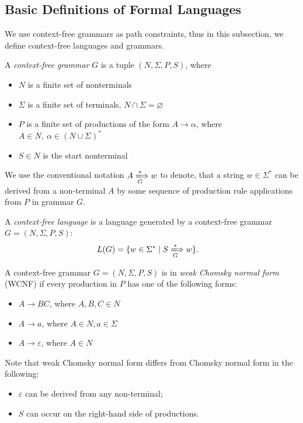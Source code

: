 \subsection{Basic Definitions of Formal Languages}
We use context-free grammars as path constraints, thus in this subsection, we define context-free languages and grammars.

\begin{definition}A \emph{context-free grammar} $G$ is a tuple $(N, \Sigma, P, S)$, where
\begin{itemize}
    \item $N$ is a finite set of nonterminals
    \item $\Sigma$ is a finite set of terminals, $N \cap \Sigma = \varnothing$
    \item $P$ is a finite set of productions of the form $A \to \alpha$, where $A \in N,\ \alpha \in (N \cup \Sigma)^*$
    \item $S \in N$ is the start nonterminal
\end{itemize} 
\end{definition}

We use the conventional notation $A \xLongrightarrow[G]{*} w$ to denote, that a
string $w \in \Sigma^*$ can be derived from a non-terminal $A$ by some sequence of production rule applications from $P$ in grammar $G$.

\begin{definition} A \emph{context-free language} is a language generated by a context-free grammar $G=(N, \Sigma, P, S)$:
\begin{align*}
    L(G) &= \{w \in \Sigma^* \mid S \xLongrightarrow[G]{*} w \}.
\end{align*}
\end{definition}

\begin{definition} A context-free grammar $G = (N, \Sigma, P, S)$ is in \emph{weak Chomsky normal form} (WCNF) if every production in $P$ has one of the following forms:
    \begin{itemize}
        \item $A \rightarrow BC$, where $A, B, C \in N$
        \item  $A \rightarrow a$, where $A \in N, a \in \Sigma$
        \item $A \rightarrow \varepsilon$, where $A \in N$
    \end{itemize}
\end{definition}

Note that weak Chomsky normal form differs from Chomsky normal form in the following:
\begin{itemize}
    \item $\varepsilon$ can be derived from any non-terminal;
    \item $S$ can occur on the right-hand side of productions.
\end{itemize}

